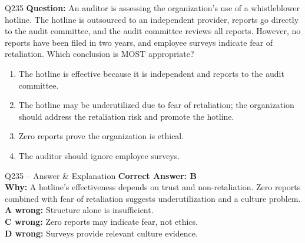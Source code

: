 \documentclass[aspectratio=169,10pt]{beamer}
\begin{document}
	\begin{frame}[t]{Q235}
		\small
		\textbf{Question:} An auditor is assessing the organization's use of a whistleblower hotline. The hotline is outsourced to an independent provider, reports go directly to the audit committee, and the audit committee reviews all reports. However, no reports have been filed in two years, and employee surveys indicate fear of retaliation. Which conclusion is MOST appropriate?
		\begin{enumerate}[label=\Alph*.,itemsep=1pt,topsep=2pt]
			\item The hotline is effective because it is independent and reports to the audit committee.
			\item The hotline may be underutilized due to fear of retaliation; the organization should address the retaliation risk and promote the hotline.
			\item Zero reports prove the organization is ethical.
			\item The auditor should ignore employee surveys.
		\end{enumerate}
	\end{frame}
	
	\begin{frame}[t]{Q235 -- Answer \& Explanation}
		\small
		\textbf{Correct Answer: B} \\[4pt]
		\textbf{Why:} A hotline's effectiveness depends on trust and non-retaliation. Zero reports combined with fear of retaliation suggests underutilization and a culture problem. \\[4pt]
		\textbf{A wrong:} Structure alone is insufficient. \\[2pt]
		\textbf{C wrong:} Zero reports may indicate fear, not ethics. \\[2pt]
		\textbf{D wrong:} Surveys provide relevant culture evidence.
	\end{frame}
	
\end{document}
